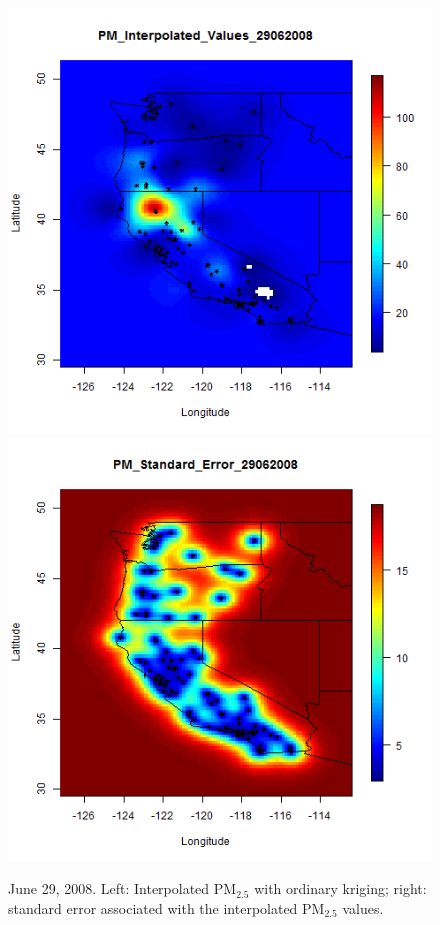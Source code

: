 \documentclass[10pt]{article}
\begin{document}
\begin{figure}[H]
\centering
  \includegraphics[width=.45\textwidth]{Interpolated_PM2008_0181.png}
  \includegraphics[width= .45\textwidth]{Standard_Error_PM2008_0181.png}
\caption{June 29, 2008.  Left: Interpolated PM$_{2.5}$ with ordinary kriging; right:
standard error associated with the interpolated PM$_{2.5}$ values.}
\label{june29}
\end{figure}
\end{document}
